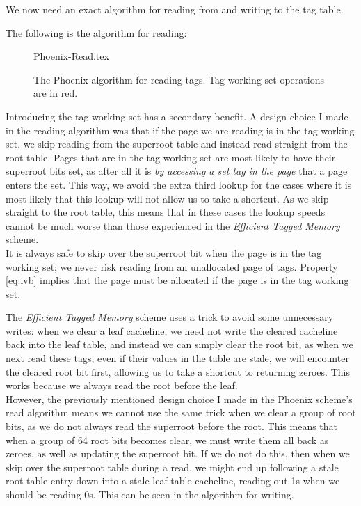We now need an exact algorithm for reading from and writing to the tag table.

The following is the algorithm for reading:
\begin{figure}[H]
	\centering
	{Phoenix-Read.tex}
	\caption{The Phoenix algorithm for reading tags. Tag working set operations are in red.}
	\label{fig:phr}
\end{figure}

Introducing the tag working set has a secondary benefit. A design choice I made in the reading algorithm was that if the page we are reading is in the tag working set, we skip reading from the superroot table and instead read straight from the root table. Pages that are in the tag working set are most likely to have their superroot bits set, as after all it is \textit{by accessing a set tag in the page} that a page enters the set. This way, we avoid the extra third lookup for the cases where it is most likely that this lookup will not allow us to take a shortcut. As we skip straight to the root table, this means that in these cases the lookup speeds cannot be much worse than those experienced in the \textit{Efficient Tagged Memory} scheme.\\
It is always safe to skip over the superroot bit when the page is in the tag working set; we never risk reading from an unallocated page of tags. Property \ref{eq:ivb} implies that the page must be allocated if the page is in the tag working set.

The \textit{Efficient Tagged Memory} scheme uses a trick to avoid some unnecessary writes: when we clear a leaf cacheline, we need not write the cleared cacheline back into the leaf table, and instead we can simply clear the root bit, as when we next read these tags, even if their values in the table are stale, we will encounter the cleared root bit first, allowing us to take a shortcut to returning zeroes. This works because we always read the root before the leaf.\\
However, the previously mentioned design choice I made in the Phoenix scheme's read algorithm means we cannot use the same trick when we clear a group of root bits, as we do not always read the superroot before the root. This means that when a group of 64 root bits becomes clear, we must write them all back as zeroes, as well as updating the superroot bit. If we do not do this, then when we skip over the superroot table during a read, we might end up following a stale root table entry down into a stale leaf table cacheline, reading out 1s when we should be reading 0s. This can be seen in the algorithm for writing.

